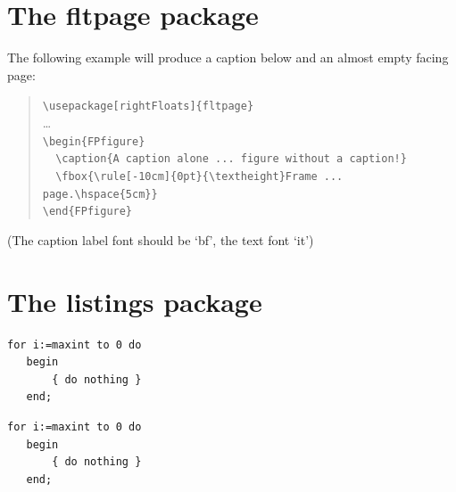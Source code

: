 \ifx\FPfigure\undefined \else
\clearpage
\section{The fltpage package}
\captionsetup[FPfigure]{labelfont=bf}

The following example will produce a caption below and an almost empty facing
page:
\begin{FPfigure}
 \captionsetup{textfont=it}
 \caption[A caption alone on a page]%
         {A caption alone on a page will belong to the
          following figure without a caption!}
 \label{FPfigure.1}
 \newlength\tempdima
 \setlength\tempdima\textheight
 \addtolength\tempdima{-7pt}%
\end{FPfigure}
\begin{quote}
  \verb|\usepackage[rightFloats]{fltpage}|\\
  \ldots\\
  \verb|\begin{FPfigure}|\\
  \verb|  \caption{A caption alone ... figure without a caption!}|\\
  \verb|  \fbox{\rule[-10cm]{0pt}{\textheight}Frame ... page.\hspace{5cm}}|\\
  \verb|\end{FPfigure}|
\end{quote}

\par\bigskip\noindent
(The caption label font should be `bf', the text font `it')

\fi

\ifx\lstlisting\undefined \else
\clearpage
\section{The listings package}

   \begin{lstlisting}[caption={Useless code},label=listing.1]
   for i:=maxint to 0 do
   begin
       { do nothing }
   end;
   \end{lstlisting}
   \begin{lstlisting}[caption={Useless code},label=listing.2,captionpos=b]
   for i:=maxint to 0 do
   begin
       { do nothing }
   end;
   \end{lstlisting}

